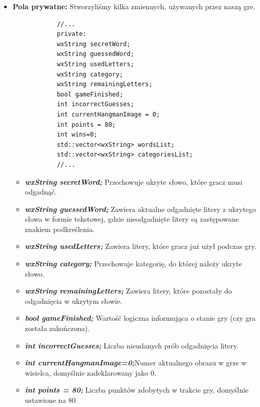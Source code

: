 \documentclass[]{report}
\begin{document}
\begin{itemize}
\begin{itemize}
			
\end{itemize}

\newpage
		
	\item \textbf{Pola prywatne:} Stworzyliśmy kilka zmiennych, używanych przez naszą gre.
		
		\begin{lstlisting}
			//...
			private:
			wxString secretWord;
			wxString guessedWord;
			wxString usedLetters;
			wxString category;
			wxString remainingLetters;
			bool gameFinished;
			int incorrectGuesses;
			int currentHangmanImage = 0;
			int points = 80;
			int wins=0;
			std::vector<wxString> wordsList;
			std::vector<wxString> categoriesList;
			//...
		\end{lstlisting}
		
\begin{itemize}
		\item \textit{\textbf{wxString secretWord;}} Przechowuje ukryte słowo, które gracz musi odgadnąć.
			
		\item \textbf{\textit{wxString guessedWord;}} Zawiera aktualne odgadnięte litery z ukrytego słowa w formie tekstowej, gdzie nieodgadnięte litery są zastępowane znakiem podkreślenia.
			
		\item \textit{\textbf{wxString usedLetters;}} Zawiera litery, które gracz już użył podczas gry.
			
		\item \textit{\textbf{wxString category;}} Przechowuje kategorię, do której należy ukryte słowo.
			
		\item \textit{\textbf{wxString remainingLetters;}} Zawiera litery, które pozostały do odgadnięcia w ukrytym słowie.
			
		\item \textit{\textbf{bool gameFinished;}} Wartość logiczna informująca o stanie gry (czy gra została zakończona).
			
		\item \textit{\textbf{int incorrectGuesses;}} Liczba nieudanych prób odgadnięcia litery.
			
		\item \textit{\textbf{int currentHangmanImage=0;}}Numer aktualnego obrazu w grze w wisielca, domyślnie zadeklarowany jako 0.
			
		\item \textit{\textbf{int points = 80;}} Liczba punktów zdobytych w trakcie gry, domyślnie ustawione na 80.
			

\end{itemize}
\end{itemize}
\end{document}
